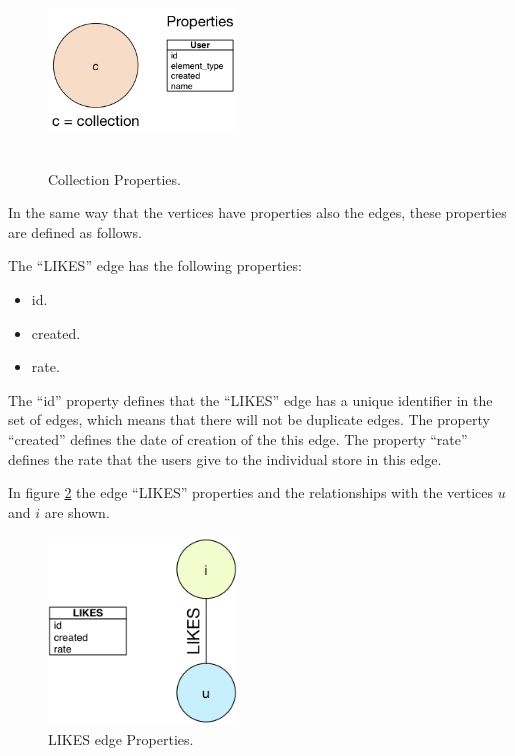 \begin{figure}
\captionsetup{justification=centering,margin=2cm}
\centering
\setlength\fboxsep{0pt}
\setlength\fboxrule{0.7pt}
\includegraphics[width=5cm,height=5cm,keepaspectratio]{img/collection_node.png}
\caption{Collection Properties.}
\label{fig:Collection_node}
\end{figure}

In the same way that the vertices have properties also the edges, these
properties are defined as follows.

The “LIKES” edge has the following properties:

\begin{itemize}
\item id.
\item created.
\item rate.
\end{itemize}

The “id” property defines that the “LIKES” edge has a unique identifier in the
set of edges, which means that there will not be duplicate edges. The property
“created” defines the date of creation of the this edge. The property “rate”
defines the rate that the users give to the individual store in this edge.

In figure \ref{fig:Likes_edge} the edge “LIKES” properties and the relationships
with the vertices $u$ and $i$ are shown.


\begin{figure}
\captionsetup{justification=centering,margin=2cm}
\centering
\setlength\fboxsep{0pt}
\setlength\fboxrule{0.7pt}
\includegraphics[width=5cm,height=5cm,keepaspectratio]{img/edge_properties_likes.png}
\caption{LIKES edge Properties.}
\label{fig:Likes_edge}
\end{figure}

